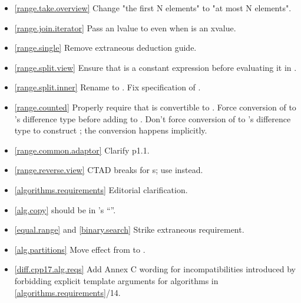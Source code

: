 \begin{itemize}
\item \ref{range.take.overview} Change "the first N elements" to
  "at most N elements".
\item \ref{range.join.iterator} Pass an lvalue to
   even when  is an xvalue.
\item \ref{range.single} Remove extraneous 
  deduction guide.
\item \ref{range.split.view} Ensure that 
  is a constant expression before evaluating it in
  .
\item \ref{range.split.inner} Rename  to .
  Fix specification of .
\item \ref{range.counted}
  Properly require that  is convertible to .
  Force conversion of  to 's difference type
  before adding to .
  Don't force conversion of  to 's difference type to
  construct ; the conversion happens implicitly.
\item \ref{range.common.adaptor} Clarify p1.1.
\item \ref{range.reverse.view}  CTAD breaks for
  s; use  instead.
\item \ref{algorithms.requirements} Editorial clarification.
\item \ref{alg.copy}  should be  in
  's ``\returns''.
\item \ref{equal.range} and \ref{binary.search} Strike extraneous requirement.
\item \ref{alg.partitions} Move effect from \returns to \effects.
\item \ref{diff.cpp17.alg.reqs} Add Annex C wording for incompatibilities
  introduced by forbidding explicit template arguments for algorithms in
  \ref{algorithms.requirements}/14.
\end{itemize}

